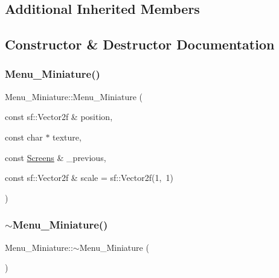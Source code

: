 \subsection*{Additional Inherited Members}


\subsection{Constructor \& Destructor Documentation}
\mbox{\label{class_menu___miniature_a9bc0436adab538cddc4074003d324a82}} 
\subsubsection{\texorpdfstring{Menu\+\_\+\+Miniature()}{Menu\_Miniature()}}
{\footnotesize\ttfamily Menu\+\_\+\+Miniature\+::\+Menu\+\_\+\+Miniature (\begin{DoxyParamCaption}\item[{const sf\+::\+Vector2f \&}]{position,  }\item[{const char $\ast$}]{texture,  }\item[{const \hyperlink{_globals_8h_a3d5776bab98402b03be09156bacf4f68}{Screens} \&}]{\+\_\+previous,  }\item[{const sf\+::\+Vector2f \&}]{scale = {\ttfamily sf\+:\+:Vector2f(1,~1)} }\end{DoxyParamCaption})}

\mbox{\label{class_menu___miniature_a6893bda2d8bc8f29ac0646e976082515}} 
\subsubsection{\texorpdfstring{$\sim$\+Menu\+\_\+\+Miniature()}{~Menu\_Miniature()}}
{\footnotesize\ttfamily Menu\+\_\+\+Miniature\+::$\sim$\+Menu\+\_\+\+Miniature (\begin{DoxyParamCaption}{ }\end{DoxyParamCaption})\hspace{0.3cm}{\ttfamily [virtual]}}



